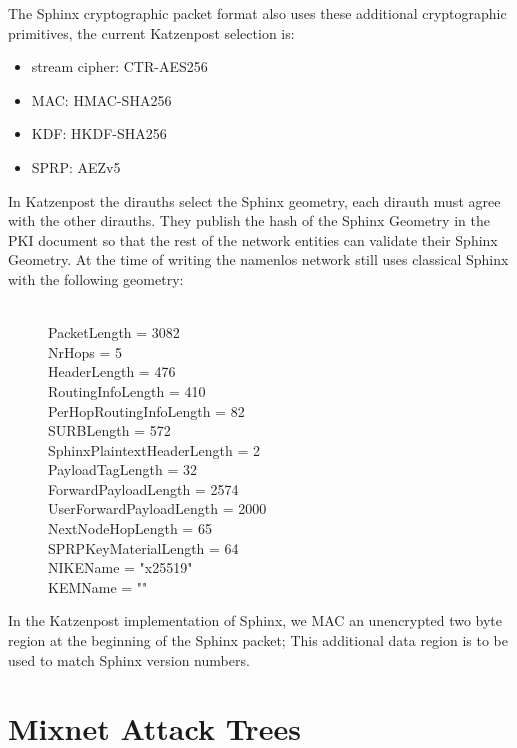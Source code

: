 \documentclass{article}
\begin{document}
The Sphinx cryptographic packet format also uses these additional cryptographic primitives, the current Katzenpost
selection is: \\

\begin{itemize}
\item stream cipher: CTR-AES256
\item MAC: HMAC-SHA256
\item KDF: HKDF-SHA256
\item SPRP: AEZv5
\end{itemize}

\vspace{.5cm}

In Katzenpost the dirauths select the Sphinx geometry, each dirauth must agree with the other dirauths.
They publish the hash of the Sphinx Geometry in the PKI document so that the rest of the network entities
can validate their Sphinx Geometry. At the time of writing the namenlos network still uses classical
Sphinx with the following geometry:

\begin{figure}[ht!]
[SphinxGeometry]\\
PacketLength = 3082\\
NrHops = 5\\
HeaderLength = 476\\
RoutingInfoLength = 410\\
PerHopRoutingInfoLength = 82\\
SURBLength = 572\\
SphinxPlaintextHeaderLength = 2\\
PayloadTagLength = 32\\
ForwardPayloadLength = 2574\\
UserForwardPayloadLength = 2000\\
NextNodeHopLength = 65\\
SPRPKeyMaterialLength = 64\\
NIKEName = "x25519"\\
KEMName = ""\\
\end{figure}

In the Katzenpost implementation of Sphinx, we MAC an unencrypted two byte region at the beginning
of the Sphinx packet; This additional data region is to be used to match Sphinx version numbers.

\pagebreak

\section{Mixnet Attack Trees}
\end{document}
